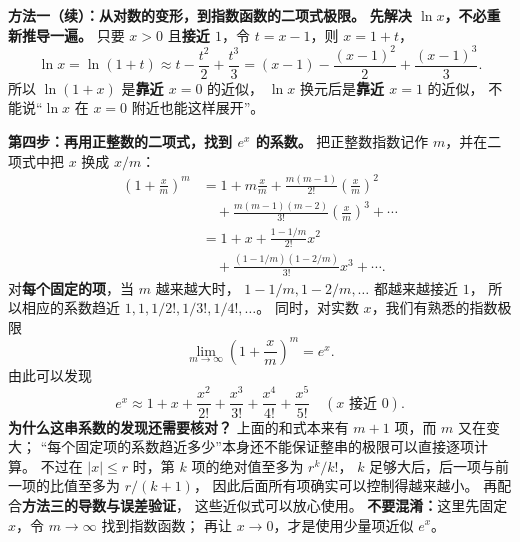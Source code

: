 \clearpage
\begin{proofbox}
\textbf{方法一（续）：从对数的变形，到指数函数的二项式极限。}
\textbf{先解决 $\ln x$，不必重新推导一遍。}
只要 $x>0$ 且\textbf{接近 $1$}，令 $t=x-1$，则 $x=1+t$，
\[
 \boxed{\ln x=\ln(1+t)
 \approx t-\frac{t^2}{2}+\frac{t^3}{3}
 =(x-1)-\frac{(x-1)^2}{2}+\frac{(x-1)^3}{3}.}
\]
所以 $\ln(1+x)$ 是\textbf{靠近 $x=0$} 的近似，
$\ln x$ 换元后是\textbf{靠近 $x=1$} 的近似，
不能说“$\ln x$ 在 $x=0$ 附近也能这样展开”。

\medskip
\textbf{第四步：再用正整数的二项式，找到 $e^x$ 的系数。}
把正整数指数记作 $m$，并在二项式中把 $x$ 换成 $x/m$：
\[
 \begin{aligned}
 \left(1+\frac{x}{m}\right)^m
 &=1+m\frac{x}{m}
 +\frac{m(m-1)}{2!}\left(\frac{x}{m}\right)^2\\
 &\quad+\frac{m(m-1)(m-2)}{3!}\left(\frac{x}{m}\right)^3+\cdots\\
 &=1+x+\frac{1-1/m}{2!}x^2\\
 &\quad+\frac{(1-1/m)(1-2/m)}{3!}x^3+\cdots.
 \end{aligned}
\]
对\textbf{每个固定的项}，当 $m$ 越来越大时，
$1-1/m,1-2/m,\ldots$ 都越来越接近 $1$，
所以相应的系数趋近
$1,1,1/2!,1/3!,1/4!,\ldots$。
同时，对实数 $x$，我们有熟悉的指数极限
\[
 \boxed{\lim_{m\to\infty}\left(1+\frac{x}{m}\right)^m=e^x.}
\]
由此可以发现
\[
 \boxed{e^x\approx1+x+\frac{x^2}{2!}
 +\frac{x^3}{3!}+\frac{x^4}{4!}+\frac{x^5}{5!}}
 \quad(x\text{ 接近 }0).
\]
\textbf{为什么这串系数的发现还需要核对？}
上面的和式本来有 $m+1$ 项，而 $m$ 又在变大；
“每个固定项的系数趋近多少”本身还不能保证整串的极限可以直接逐项计算。
不过在 $|x|\le r$ 时，第 $k$ 项的绝对值至多为 $r^k/k!$，
$k$ 足够大后，后一项与前一项的比值至多为 $r/(k+1)$，
因此后面所有项确实可以控制得越来越小。
再配合\textbf{方法三的导数与误差验证}，
这些近似式可以放心使用。
\textbf{不要混淆：}这里先固定 $x$，令 $m\to\infty$ 找到指数函数；
再让 $x\to0$，才是使用少量项近似 $e^x$。
\end{proofbox}


